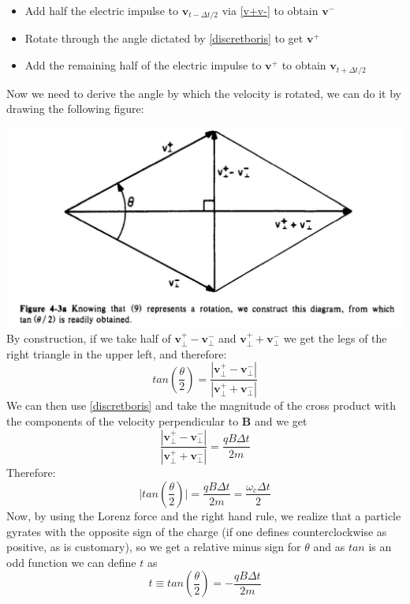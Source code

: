 \documentclass[12pt]{article}
\begin{document}
\begin{itemize}
\item Add half the electric impulse to $\textbf{v}_{t-\Delta t/2}$ via \eqref{v+v-} to obtain $\textbf{v}^-$
\item Rotate through the angle dictated by \eqref{discretboris} to get $\textbf{v}^+$
\item Add the remaining half of the electric impulse to $\textbf{v}^+$ to obtain $\textbf{v}_{t+\Delta t/2}$
\end{itemize}
Now we need to derive the angle by which the velocity is rotated, we can do it by drawing the following figure:

\hspace{-2cm}\includegraphics[scale=0.5]{anglerotated}
By construction, if we take half of $\textbf{v}^+_{\perp}-\textbf{v}^-_{\perp}$ and $\textbf{v}^+_{\perp}+\textbf{v}^-_{\perp}$ we get the legs of the right triangle in the upper left, and therefore:
$$tan\left(\frac{\theta}{2}\right)=\frac{|\textbf{v}^+_{\perp}-\textbf{v}^-_{\perp}|}{|\textbf{v}^+_{\perp}+\textbf{v}^-_{\perp}|}$$
We can then use \eqref{discretboris} and take the magnitude of the cross product with the components of the velocity perpendicular to $\textbf{B}$ and we get
$$\frac{|\textbf{v}^+_{\perp}-\textbf{v}^-_{\perp}|}{|\textbf{v}^+_{\perp}+\textbf{v}^-_{\perp}|}=\frac{qB\Delta t}{2m}$$
Therefore:
$$\bigg| tan\left(\frac{\theta}{2}\right)\bigg|=\frac{qB\Delta t}{2m}=\frac{\omega_c\Delta t}{2}$$
Now, by using the Lorenz force and the right hand rule, we realize that a particle gyrates with the opposite sign of the charge (if one defines counterclockwise as positive, as is customary), so we get a relative minus sign for $\theta$ and as $tan$ is an odd function we can define $t$ as
\begin{equation}\label{angleboris}
t\equiv tan\left(\frac{\theta}{2}\right)=-\frac{qB\Delta t}{2m}
\end{equation}
\end{document}
